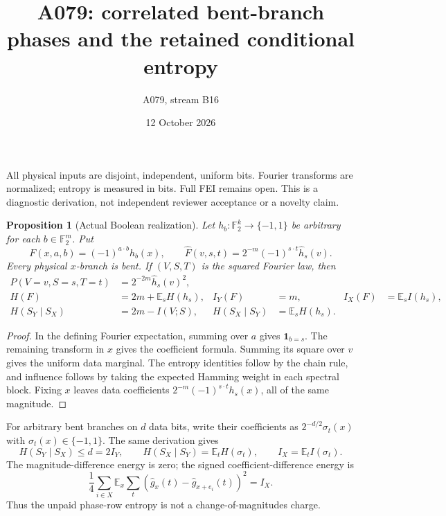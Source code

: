 \documentclass[11pt]{article}
\newtheorem{proposition}{Proposition}
\newcommand{\E}{\mathbb E}
\newcommand{\F}{\mathbb F}
\newcommand{\wh}{\widehat}
\begin{document}
\title{A079: correlated bent-branch phases and the retained conditional entropy}
\author{A079, stream B16}
\date{12 October 2026}
\maketitle
All physical inputs are disjoint, independent, uniform bits. Fourier transforms are normalized; entropy is measured in bits. Full FEI remains open. This is a diagnostic derivation, not independent reviewer acceptance or a novelty claim.

\begin{proposition}[Actual Boolean realization]
Let $h_b:\F_2^k\to\{-1,1\}$ be arbitrary for each $b\in\F_2^m$. Put
\[
 F(x,a,b)=(-1)^{a\cdot b}h_b(x),\qquad
 \wh F(v,s,t)=2^{-m}(-1)^{s\cdot t}\wh h_s(v).
\]
Every physical $x$-branch is bent. If $(V,S,T)$ is the squared Fourier law, then
\begin{align*}
 P(V=v,S=s,T=t)&=2^{-2m}\wh h_s(v)^2,\\
 H(F)&=2m+\E_s H(h_s),& I_Y(F)&=m,& I_X(F)&=\E_s I(h_s),\\
 H(S_Y\mid S_X)&=2m-I(V;S),&H(S_X\mid S_Y)&=\E_s H(h_s).
\end{align*}
\end{proposition}
\begin{proof}
In the defining Fourier expectation, summing over $a$ gives $\mathbf1_{b=s}$. The remaining transform in $x$ gives the coefficient formula. Summing its square over $v$ gives the uniform data marginal. The entropy identities follow by the chain rule, and influence follows by taking the expected Hamming weight in each spectral block. Fixing $x$ leaves data coefficients $2^{-m}(-1)^{s\cdot t}h_s(x)$, all of the same magnitude.
\end{proof}

For arbitrary bent branches on $d$ data bits, write their coefficients as $2^{-d/2}\sigma_t(x)$ with $\sigma_t(x)\in\{-1,1\}$. The same derivation gives
\[
 H(S_Y\mid S_X)\le d=2I_Y,\qquad
 H(S_X\mid S_Y)=\E_t H(\sigma_t),\qquad
 I_X=\E_t I(\sigma_t).
\]
The magnitude-difference energy is zero; the signed coefficient-difference energy is
\[
 \frac14\sum_{i\in X}\E_x\sum_t
 (\wh g_x(t)-\wh g_{x+e_i}(t))^2=I_X.
\]
Thus the unpaid phase-row entropy is not a change-of-magnitudes charge.
\end{document}
